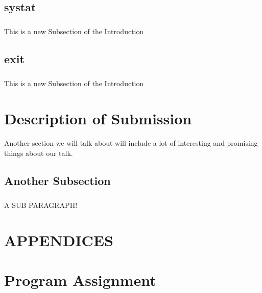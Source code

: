 \documentclass[10pt]{article}
\begin{document}
\subsection{systat}
\subparagraph{}
This is a new Subsection of the Introduction

\subsection{exit}
\subparagraph{}
This is a new Subsection of the Introduction

\section{Description of Submission}
\paragraph{}
Another section we will talk about will include a lot of interesting and promising things about our talk.


\subsection{Another Subsection}
\subparagraph{}
A SUB PARAGRAPH!

\section{APPENDICES}
\appendix

\section{Program Assignment}

\end{document}
